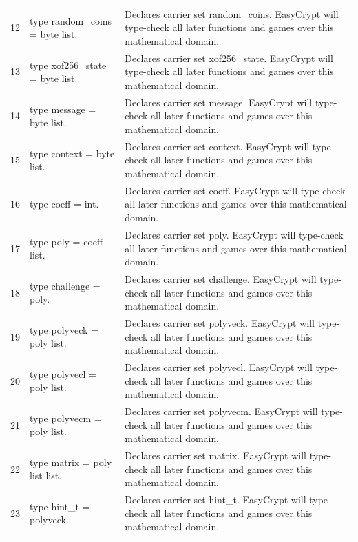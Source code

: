 \documentclass[10pt]{article}
\begin{document}
\begin{longtable}{r L{0.53\textwidth} L{0.37\textwidth}}
12 & {\ttfamily\scriptsize type random\_coins = byte list.} & Declares carrier set random\_coins.  EasyCrypt will type-check all later functions and games over this mathematical domain. \\
13 & {\ttfamily\scriptsize type xof256\_state = byte list.} & Declares carrier set xof256\_state.  EasyCrypt will type-check all later functions and games over this mathematical domain. \\
14 & {\ttfamily\scriptsize type message = byte list.} & Declares carrier set message.  EasyCrypt will type-check all later functions and games over this mathematical domain. \\
15 & {\ttfamily\scriptsize type context = byte list.} & Declares carrier set context.  EasyCrypt will type-check all later functions and games over this mathematical domain. \\
16 & {\ttfamily\scriptsize type coeff = int.} & Declares carrier set coeff.  EasyCrypt will type-check all later functions and games over this mathematical domain. \\
17 & {\ttfamily\scriptsize type poly = coeff list.} & Declares carrier set poly.  EasyCrypt will type-check all later functions and games over this mathematical domain. \\
18 & {\ttfamily\scriptsize type challenge = poly.} & Declares carrier set challenge.  EasyCrypt will type-check all later functions and games over this mathematical domain. \\
19 & {\ttfamily\scriptsize type polyveck = poly list.} & Declares carrier set polyveck.  EasyCrypt will type-check all later functions and games over this mathematical domain. \\
20 & {\ttfamily\scriptsize type polyvecl = poly list.} & Declares carrier set polyvecl.  EasyCrypt will type-check all later functions and games over this mathematical domain. \\
21 & {\ttfamily\scriptsize type polyvecm = poly list.} & Declares carrier set polyvecm.  EasyCrypt will type-check all later functions and games over this mathematical domain. \\
22 & {\ttfamily\scriptsize type matrix = poly list list.} & Declares carrier set matrix.  EasyCrypt will type-check all later functions and games over this mathematical domain. \\
23 & {\ttfamily\scriptsize type hint\_t = polyveck.} & Declares carrier set hint\_t.  EasyCrypt will type-check all later functions and games over this mathematical domain. \\

\end{longtable}
\end{document}
